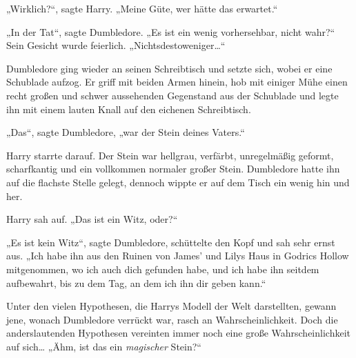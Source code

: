 „Wirklich?“, sagte Harry. „Meine Güte, wer hätte das erwartet.“

„In der Tat“, sagte Dumbledore. „Es ist ein wenig vorhersehbar, nicht wahr?“ Sein Gesicht wurde feierlich. „Nichtsdestoweniger…“

Dumbledore ging wieder an seinen Schreibtisch und setzte sich, wobei er eine Schublade aufzog. Er griff mit beiden Armen hinein, hob mit einiger Mühe einen recht großen und schwer aussehenden Gegenstand aus der Schublade und legte ihn mit einem lauten Knall auf den eichenen Schreibtisch.

„Das“, sagte Dumbledore, „war der Stein deines Vaters.“

Harry starrte darauf. Der Stein war hellgrau, verfärbt, unregelmäßig geformt, scharfkantig und ein vollkommen normaler großer Stein. Dumbledore hatte ihn auf die flachste Stelle gelegt, dennoch wippte er auf dem Tisch ein wenig hin und her.

Harry sah auf. „Das ist ein Witz, oder?“

„Es ist kein Witz“, sagte Dumbledore, schüttelte den Kopf und sah sehr ernst aus. „Ich habe ihn aus den Ruinen von James’ und Lilys Haus in Godrics Hollow mitgenommen, wo ich auch dich gefunden habe, und ich habe ihn seitdem aufbewahrt, bis zu dem Tag, an dem ich ihn dir geben kann.“

Unter den vielen Hypothesen, die Harrys Modell der Welt darstellten, gewann jene, wonach Dumbledore verrückt war, rasch an Wahrscheinlichkeit. Doch die anderslautenden Hypothesen vereinten immer noch eine große Wahrscheinlichkeit auf sich… „Ähm, ist das ein \emph{magischer} Stein?“

